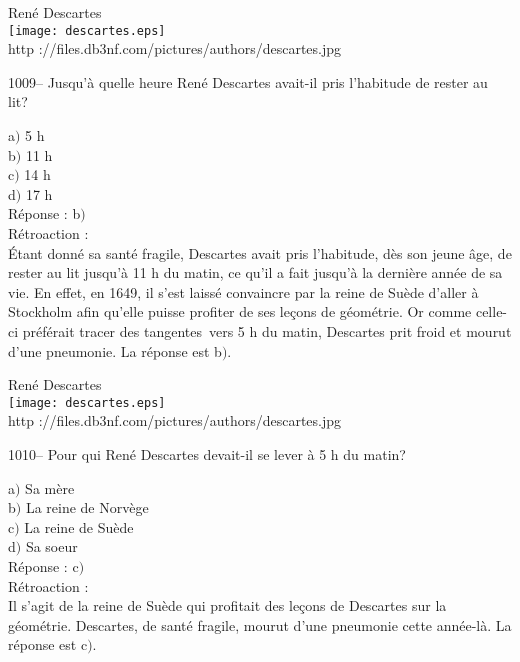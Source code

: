 ﻿\documentclass[letterpaper, 12pt]{article}
\begin{document}
        \begin{center}
        Ren\'e Descartes\\
    \texttt{[image: descartes.eps]}\\
        {\footnotesize http
://files.db3nf.com/pictures/authors/descartes.jpg}
    \end{center}

1009-- Jusqu'\`a quelle heure Ren\'e Descartes avait-il pris
l'habitude de rester au lit?

a$)$ 5 h \\
b$)$ 11 h \\
c$)$ 14 h \\
d$)$ 17 h\\

R\'eponse : b$)$\\

R\'etroaction :\\
\'Etant donn\'e sa sant\'e fragile, Descartes avait pris l'habitude,
d\`es son jeune \^age, de rester au lit jusqu'\`a 11 h du matin, ce
qu'il a fait jusqu'\`a la derni\`ere ann\'ee de sa vie.  En effet,
en 1649, il s'est laiss\'e convaincre par la reine de Su\`ede
d'aller \`a Stockholm afin qu'elle puisse profiter de ses le\c cons
de g\'eom\'etrie.  Or comme celle-ci pr\'ef\'erait \og tracer des
tangentes\fg\ vers 5 h du matin, Descartes prit froid et mourut
d'une pneumonie.
La r\'eponse est b$)$.\\

        \begin{center}
        Ren\'e Descartes\\
    \texttt{[image: descartes.eps]}\\
        {\footnotesize http
://files.db3nf.com/pictures/authors/descartes.jpg}
    \end{center}

1010-- Pour qui Ren\'e Descartes devait-il se lever \`a 5 h du
matin?

a$)$ Sa m\`ere \\
b$)$ La reine de Norv\`ege \\
c$)$ La reine de Su\`ede \\
d$)$ Sa soeur\\

R\'eponse : c$)$\\

R\'etroaction : \\
Il s'agit de la reine de Su\`ede qui profitait des le\c cons de
Descartes sur la g\'eom\'etrie. Descartes, de sant\'e fragile,
mourut d'une pneumonie cette ann\'ee-l\`a.
La r\'eponse est c$)$.\\
\end{document}
